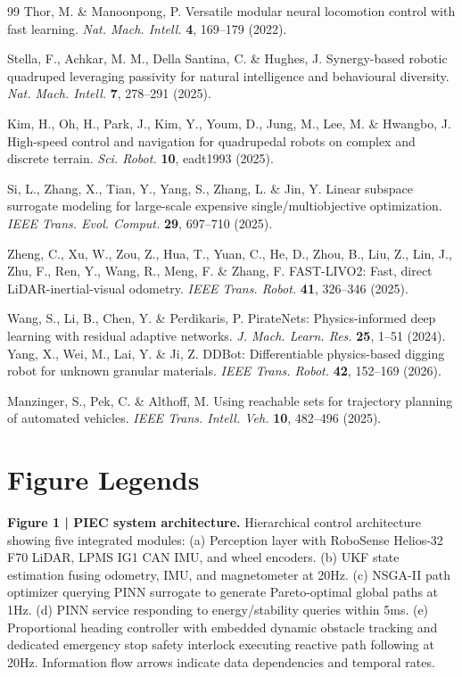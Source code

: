 \documentclass[pdflatex,sn-nature]{sn-jnl}%
\begin{document}
\begin{thebibliography}{99}
Thor, M. \& Manoonpong, P. Versatile modular neural locomotion control with fast learning. \textit{Nat. Mach. Intell.} \textbf{4}, 169--179 (2022).

Stella, F., Achkar, M. M., Della Santina, C. \& Hughes, J. Synergy-based robotic quadruped leveraging passivity for natural intelligence and behavioural diversity. \textit{Nat. Mach. Intell.} \textbf{7}, 278--291 (2025).


Kim, H., Oh, H., Park, J., Kim, Y., Youm, D., Jung, M., Lee, M. \& Hwangbo, J. High-speed control and navigation for quadrupedal robots on complex and discrete terrain.
\textit{Sci. Robot.} \textbf{10}, eadt1993 (2025).

Si, L., Zhang, X., Tian, Y., Yang, S., Zhang, L. \& Jin, Y. Linear subspace surrogate modeling for large-scale expensive single/multiobjective optimization.
\textit{IEEE Trans. Evol. Comput.} \textbf{29}, 697--710 (2025).


Zheng, C., Xu, W., Zou, Z., Hua, T., Yuan, C., He, D., Zhou, B., Liu, Z., Lin, J., Zhu, F., Ren, Y., Wang, R., Meng, F. \& Zhang, F. {FAST-LIVO2}: Fast, direct LiDAR-inertial-visual odometry.
\textit{IEEE Trans. Robot.} \textbf{41}, 326--346 (2025).

Wang, S., Li, B., Chen, Y. \& Perdikaris, P. PirateNets: Physics-informed deep learning with residual adaptive networks.
\textit{J. Mach. Learn. Res.} \textbf{25}, 1--51 (2024).
Yang, X., Wei, M., Lai, Y. \& Ji, Z. {DDBot}: Differentiable physics-based digging robot for unknown granular materials.
\textit{IEEE Trans. Robot.} \textbf{42}, 152--169 (2026).

Manzinger, S., Pek, C. \& Althoff, M. Using reachable sets for trajectory planning of automated vehicles.
\textit{IEEE Trans. Intell. Veh.} \textbf{10}, 482--496 (2025).
\section*{Figure Legends}

\textbf{Figure 1 | PIEC system architecture.} Hierarchical control architecture showing five integrated modules: (a) Perception layer with RoboSense Helios-32 F70 LiDAR, LPMS IG1 CAN IMU, and wheel encoders. (b) UKF state estimation fusing odometry, IMU, and magnetometer at 20Hz. (c) NSGA-II path optimizer querying PINN surrogate to generate Pareto-optimal global paths at 1Hz. (d) PINN service responding to energy/stability queries within 5ms. (e) Proportional heading controller with embedded dynamic obstacle tracking and dedicated emergency stop safety interlock executing reactive path following at 20Hz. Information flow arrows indicate data dependencies and temporal rates.


\end{thebibliography}
\end{document}
